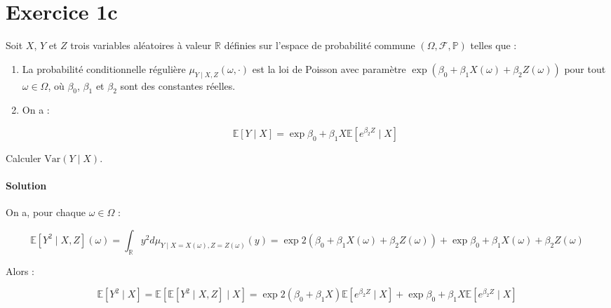 \documentclass[../main.tex]{subfiles}
\begin{document}
\section{Exercice 1c}
\begin{CJK*}{UTF8}{gbsn}
Soit $X$, $Y$ et $Z$ trois variables aléatoires à valeur $\mathbb{R}$ définies sur
l'espace de probabilité commune $(\Omega, \mathcal{F}, \mathbb{P})$ telles que :

\begin{enumerate}
    \item La probabilité conditionnelle régulière $\mu_{Y \mid X, Z}(\omega, \cdot)$ est la loi de Poisson avec paramètre 
    $\exp(\beta_0 + \beta_1 X(\omega) + \beta_2 Z(\omega))$ pour tout $\omega \in \Omega$, 
    où $\beta_0$, $\beta_1$ et $\beta_2$ sont des constantes réelles.
    \item On a :
    
    \begin{equation*}
        \mathbb{E}[Y \mid X] = \exp{\beta_0+\beta_1 X} \mathbb{E}[e^{\beta_2 Z} \mid X]
    \end{equation*}
\end{enumerate}

Calculer $\text{Var}(Y \mid X)$.

\smallskip
\paragraph{Solution}
On a, pour chaque $\omega \in \Omega$ :

\begin{equation*}
    \mathbb{E}[Y^2 \mid X, Z](\omega) = \int_{\mathbb{R}} y^2 d \mu_{Y \mid X = X(\omega), Z = Z(\omega)} (y) = 
    \exp{2(\beta_0 + \beta_1X(\omega) + \beta_2Z(\omega))}  + \exp{\beta_0 + \beta_1X(\omega) + \beta_2Z(\omega)}
\end{equation*}

Alors :

\begin{equation*}
    \mathbb{E}[Y^2 \mid X] = \mathbb{E}[\mathbb{E}[Y^2 \mid X, Z] \mid X] = 
    \exp{2(\beta_0+\beta_1X)}\mathbb{E}[e^{\beta_2 Z} \mid X] + \exp{\beta_0 + \beta_1 X} \mathbb{E}[e^{\beta_2Z} \mid X]
\end{equation*}
\end{CJK*}
\end{document}
